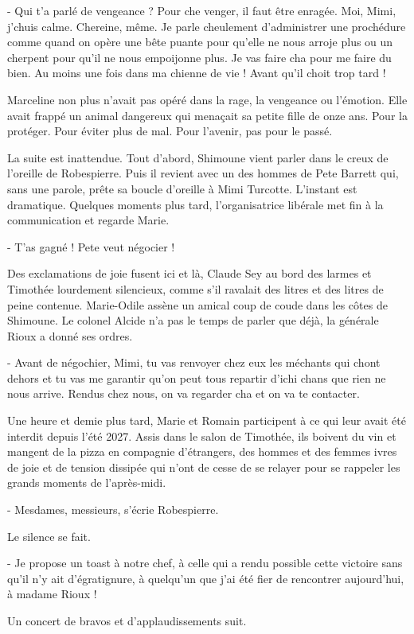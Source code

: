 - Qui t’a parlé de vengeance ? Pour che venger, il faut être enragée. Moi, Mimi, j’chuis calme. Chereine, même. Je parle cheulement d’administrer une prochédure comme quand on opère une bête puante pour qu’elle ne nous arroje plus ou un cherpent pour qu’il ne nous empoijonne plus. Je vas faire cha pour me faire du bien. Au moins une fois dans ma chienne de vie ! Avant qu’il choit trop tard !

Marceline non plus n’avait pas opéré dans la rage, la vengeance ou l’émotion. Elle avait frappé un animal dangereux qui menaçait sa petite fille de onze ans. Pour la protéger. Pour éviter plus de mal. Pour l’avenir, pas pour le passé.

La suite est inattendue. Tout d’abord, Shimoune vient parler dans le creux de l’oreille de Robespierre. Puis il revient avec un des hommes de Pete Barrett qui, sans une parole, prête sa boucle d’oreille à Mimi Turcotte. L’instant est dramatique. Quelques moments plus tard, l’organisatrice libérale met fin à la communication et regarde Marie.

- T’as gagné ! Pete veut négocier !

Des exclamations de joie fusent ici et là, Claude Sey au bord des larmes et Timothée lourdement silencieux, comme s’il ravalait des litres et des litres de peine contenue. Marie-Odile assène un amical coup de coude dans les côtes de Shimoune. Le colonel Alcide n’a pas le temps de parler que déjà, la générale Rioux a donné ses ordres.

- Avant de négochier, Mimi, tu vas renvoyer chez eux les méchants qui chont dehors et tu vas me garantir qu’on peut tous repartir d’ichi chans que rien ne nous arrive. Rendus chez nous, on va regarder cha et on va te contacter.

Une heure et demie plus tard, Marie et Romain participent à ce qui leur avait été interdit depuis l’été 2027. Assis dans le salon de Timothée, ils boivent du vin et mangent de la pizza en compagnie d’étrangers, des hommes et des femmes ivres de joie et de tension dissipée qui n’ont de cesse de se relayer pour se rappeler les grands moments de l’après-midi.

- Mesdames, messieurs, s’écrie Robespierre.

Le silence se fait.

- Je propose un toast à notre chef, à celle qui a rendu possible cette victoire sans qu’il n’y ait d’égratignure, à quelqu’un que j’ai été fier de rencontrer aujourd’hui, à madame Rioux !

Un concert de bravos et d’applaudissements suit.


